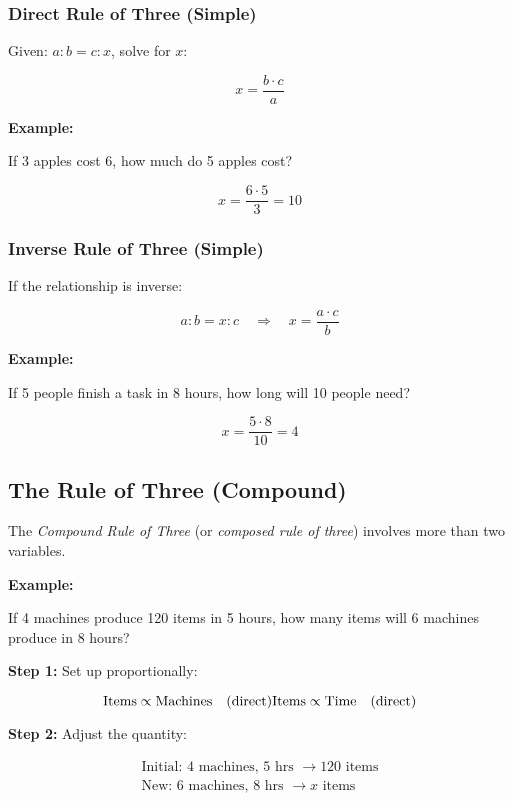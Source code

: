 \subsubsection{Direct Rule of Three (Simple)}

Given: \(a : b = c : x\), solve for \(x\):

\[
    x = \frac{b \cdot c}{a}
\]

\textbf{Example:}
\vspace{\baselineskip}
 
If 3 apples cost 6, how much do 5 apples cost?

\[
    x = \frac{6 \cdot 5}{3} = 10
\]

\subsubsection{Inverse Rule of Three (Simple)}

If the relationship is inverse:

\[
    a : b = x : c \quad \Rightarrow \quad x = \frac{a \cdot c}{b}
\]

\textbf{Example:}
\vspace{\baselineskip}
 
If 5 people finish a task in 8 hours, how long will 10 people need?

\[
    x = \frac{5 \cdot 8}{10} = 4
\]

\subsection{The Rule of Three (Compound)}

The \emph{Compound Rule of Three} (or \emph{composed rule of three}) involves more than two variables.
\vspace{\baselineskip}

\textbf{Example:}
\vspace{\baselineskip}
 
If 4 machines produce 120 items in 5 hours, how many items will 6 machines produce in 8 hours?
\vspace{\baselineskip}

\textbf{Step 1:} Set up proportionally:

\[
    \text{Items} \propto \text{Machines} \quad (\text{direct}) \\
    \text{Items} \propto \text{Time} \quad (\text{direct})
\]

\textbf{Step 2:} Adjust the quantity:

\begin{align*}
    \text{Initial: } 4 \text{ machines, } 5 \text{ hrs } \rightarrow 120 \text{ items} \\
    \text{New: } 6 \text{ machines, } 8 \text{ hrs } \rightarrow x \text{ items}
\end{align*}

